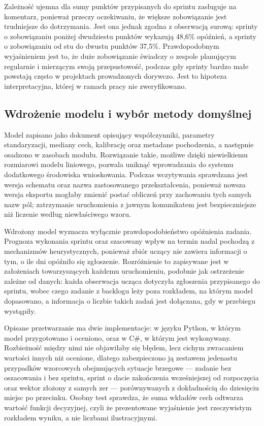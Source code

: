 Zależność ujemna dla sumy punktów przypisanych do sprintu zasługuje na komentarz, ponieważ przeczy oczekiwaniu, że większe zobowiązanie jest trudniejsze do dotrzymania. Jest ona jednak zgodna z obserwacją surową: sprinty o zobowiązaniu poniżej dwudziestu punktów wykazują 48,6\% opóźnień, a sprinty o zobowiązaniu od stu do dwustu punktów 37,5\%. Prawdopodobnym wyjaśnieniem jest to, że duże zobowiązanie świadczy o zespole planującym regularnie i mierzącym swoją przepustowość, podczas gdy sprinty bardzo małe powstają często w projektach prowadzonych dorywczo. Jest to hipoteza interpretacyjna, której w ramach pracy nie zweryfikowano.

\subsection{Wdrożenie modelu i wybór metody domyślnej}

Model zapisano jako dokument opisujący współczynniki, parametry standaryzacji, mediany cech, kalibrację oraz metadane pochodzenia, a następnie osadzono w zasobach modułu. Rozwiązanie takie, możliwe dzięki niewielkiemu rozmiarowi modelu liniowego, pozwala uniknąć wprowadzania do systemu dodatkowego środowiska wnioskowania. Podczas wczytywania sprawdzana jest wersja schematu oraz nazwa zastosowanego przekształcenia, ponieważ nowsza wersja eksportu mogłaby zmienić postać obliczeń przy zachowaniu tych samych nazw pól; zatrzymanie uruchomienia z jawnym komunikatem jest bezpieczniejsze niż liczenie według niewłaściwego wzoru.

Wdrożony model wyznacza wyłącznie prawdopodobieństwo opóźnienia zadania. Prognoza wykonania sprintu oraz szacowany wpływ na termin nadal pochodzą z mechanizmów heurystycznych, ponieważ zbiór uczący nie zawiera informacji o tym, o ile dni opóźniło się zgłoszenie. Rozróżnienie to zapisywane jest w założeniach towarzyszących każdemu uruchomieniu, podobnie jak ostrzeżenie zależne od danych: każda obserwacja ucząca dotyczyła zgłoszenia przypisanego do sprintu, wobec czego zadanie z backlogu leży poza rozkładem, na którym model dopasowano, a informacja o liczbie takich zadań jest dołączana, gdy w przebiegu wystąpiły.

Opisane przetwarzanie ma dwie implementacje: w języku Python, w którym model przygotowano i oceniono, oraz w C\#, w którym jest wykonywany. Rozbieżność między nimi nie objawiłaby się błędem, lecz cichym zwracaniem wartości innych niż ocenione, dlatego zabezpieczono ją zestawem jedenastu przypadków wzorcowych obejmujących sytuacje brzegowe — zadanie bez oszacowania i bez sprintu, sprint o dacie zakończenia wcześniejszej od rozpoczęcia oraz wektor złożony z samych zer — porównywanych z dokładnością do dziesięciu miejsc po przecinku. Osobny test sprawdza, że suma wkładów cech odtwarza wartość funkcji decyzyjnej, czyli że prezentowane wyjaśnienie jest rzeczywistym rozkładem wyniku, a nie liczbami ilustracyjnymi.

